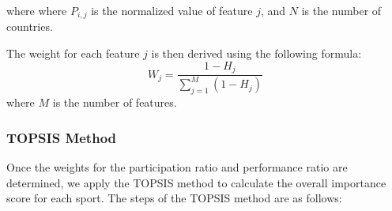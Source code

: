 \documentclass[12pt]{article}  %
\begin{document}
where where $P_{i,j}$ is the normalized value of feature $j$, and $N$ is the number of countries.

The weight for each feature $j$ is then derived using the following formula:
\begin{equation}
    W_j = \frac{1 - H_j}{\sum_{j=1}^{M} (1 - H_j)}\tag{21}
\end{equation}
where $M$ is the number of features. 

\subsubsection{TOPSIS Method}
Once the weights for the participation ratio and performance ratio are determined, we apply the TOPSIS method to calculate the overall importance score for each sport. The steps of the TOPSIS method are as follows:
\end{document}
